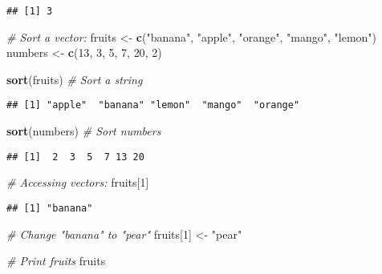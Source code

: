 \documentclass[
]{article}
\newenvironment{Shaded}{\begin{snugshade}}{\end{snugshade}}
\newcommand{\CommentTok}[1]{\textcolor[rgb]{0.56,0.35,0.01}{\textit{#1}}}
\newcommand{\DecValTok}[1]{\textcolor[rgb]{0.00,0.00,0.81}{#1}}
\newcommand{\FunctionTok}[1]{\textcolor[rgb]{0.13,0.29,0.53}{\textbf{#1}}}
\newcommand{\NormalTok}[1]{#1}
\newcommand{\OtherTok}[1]{\textcolor[rgb]{0.56,0.35,0.01}{#1}}
\newcommand{\StringTok}[1]{\textcolor[rgb]{0.31,0.60,0.02}{#1}}
\begin{document}
\begin{verbatim}
## [1] 3
\end{verbatim}

\begin{Shaded}
\begin{Highlighting}[]
\CommentTok{\# Sort a vector:}
\NormalTok{fruits }\OtherTok{\textless{}{-}} \FunctionTok{c}\NormalTok{(}\StringTok{"banana"}\NormalTok{, }\StringTok{"apple"}\NormalTok{, }\StringTok{"orange"}\NormalTok{, }\StringTok{"mango"}\NormalTok{, }\StringTok{"lemon"}\NormalTok{)}
\NormalTok{numbers }\OtherTok{\textless{}{-}} \FunctionTok{c}\NormalTok{(}\DecValTok{13}\NormalTok{, }\DecValTok{3}\NormalTok{, }\DecValTok{5}\NormalTok{, }\DecValTok{7}\NormalTok{, }\DecValTok{20}\NormalTok{, }\DecValTok{2}\NormalTok{)}

\FunctionTok{sort}\NormalTok{(fruits)  }\CommentTok{\# Sort a string}
\end{Highlighting}
\end{Shaded}

\begin{verbatim}
## [1] "apple"  "banana" "lemon"  "mango"  "orange"
\end{verbatim}

\begin{Shaded}
\begin{Highlighting}[]
\FunctionTok{sort}\NormalTok{(numbers) }\CommentTok{\# Sort numbers}
\end{Highlighting}
\end{Shaded}

\begin{verbatim}
## [1]  2  3  5  7 13 20
\end{verbatim}

\begin{Shaded}
\begin{Highlighting}[]
\CommentTok{\# Accessing vectors:}
\NormalTok{fruits[}\DecValTok{1}\NormalTok{]}
\end{Highlighting}
\end{Shaded}

\begin{verbatim}
## [1] "banana"
\end{verbatim}

\begin{Shaded}
\begin{Highlighting}[]
\CommentTok{\# Change "banana" to "pear"}
\NormalTok{fruits[}\DecValTok{1}\NormalTok{] }\OtherTok{\textless{}{-}} \StringTok{"pear"}

\CommentTok{\# Print fruits}
\NormalTok{fruits}
\end{Highlighting}
\end{Shaded}
\end{document}
